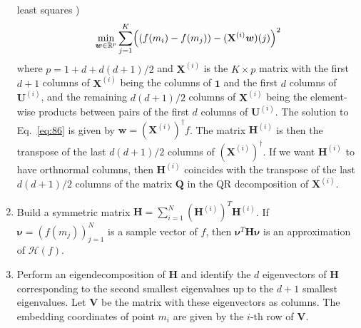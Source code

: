 \begin{enumerate}
  least squares \citep[see][]{kim09:_semi_regres_hessian})
  \begin{equation}
    \label{eq:86}
    \min_{\bm{w} \in \mathbb{R}^{p}} \sum_{j=1}^{K} \Bigl( (f(m_i) -
    f(m_j)) - (\mathbf{X}^{(i)} \bm{w})(j)\Bigr)^2
  \end{equation}
  where $p = 1 + d + d(d+1)/2$ and $\mathbf{X}^{(i)}$ is the $K \times
  p$ matrix with the first $d+1$ columns of $\mathbf{X}^{(i)}$ being
  the columns of $\bm{1}$ and the first $d$ columns of
  $\mathbf{U}^{(i)}$, and the remaining $d(d+1)/2$ columns of
  $\mathbf{X}^{(i)}$ being the element-wise products between pairs of
  the first $d$ columns of $\mathbf{U}^{(i)}$. The solution to
  Eq.~\eqref{eq:86} is given by $\bm{w} =
  (\mathbf{X}^{(i)})^{\dagger}f$. The matrix $\mathbf{H}^{(i)}$ is
  then the transpose of the last $d(d+1)/2$ columns of
  $(\mathbf{X}^{(i)}  )^{\dagger}$. If we want $\mathbf{H}^{(i)}$ to
  have orthnormal columns, then $\mathbf{H}^{(i)}$ coincides with the
  transpose of the last $d(d+1)/2$ columns of the matrix $\mathbf{Q}$
  in the QR decomposition of $\mathbf{X}^{(i)}$.
\item Build a symmetric matrix $\mathbf{H} =
  \sum_{i=1}^{N}{(\mathbf{H}^{(i)})^{T}\mathbf{H}^{(i)}}$. If
  $\bm{\nu} = (f(m_j))_{j=1}^{N}$ is a sample vector of $f$, then
  $\bm{\nu}^{T} \mathbf{H} \bm{\nu}$ is an approximation of
  $\mathcal{H}(f)$. 
\item Perform an eigendecomposition of $\mathbf{H}$ and identify the
  $d$ eigenvectors of $\mathbf{H}$ corresponding to the second
  smallest eigenvalues up to the $d+1$ smallest eigenvalues. Let
  $\mathbf{V}$ be the matrix with these eigenvectors as columns. The
  embedding coordinates of point $m_i$ are given by the $i$-th row of
  $\mathbf{V}$.
\end{enumerate}

